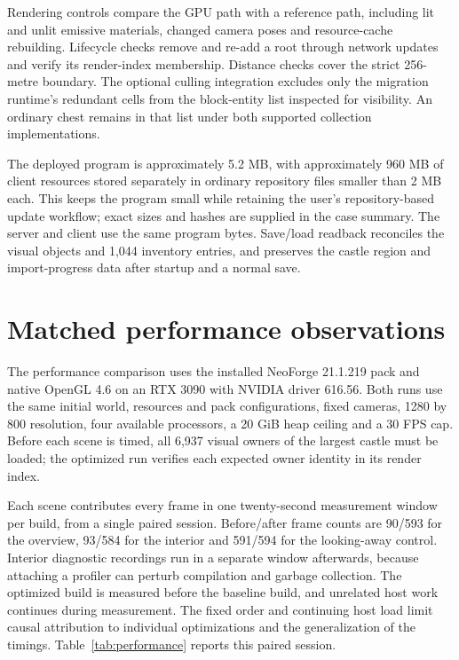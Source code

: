 \documentclass[11pt]{article}
\begin{document}
Rendering controls compare the GPU path with a reference path, including lit and
unlit emissive materials, changed camera poses and resource-cache rebuilding.
Lifecycle checks remove and re-add a root through network updates and verify its
render-index membership. Distance checks cover the strict 256-metre boundary.
The optional culling integration excludes only the migration runtime's redundant
cells from the block-entity list inspected for visibility. An ordinary chest
remains in that list under both supported collection implementations.

The deployed program is approximately 5.2 MB, with approximately 960 MB of client
resources stored separately in ordinary repository files smaller than 2 MB each.
This keeps the program small while retaining the user's repository-based update
workflow; exact sizes and hashes are supplied in the case summary. The server
and client use the same program bytes. Save/load readback reconciles the visual
objects and 1,044 inventory entries, and preserves the castle region and
import-progress data after startup and a normal save.

\section{Matched performance observations}

The performance comparison uses the installed NeoForge 21.1.219 pack and native
OpenGL 4.6 on an RTX 3090 with NVIDIA driver 616.56. Both runs use the same initial
world, resources and pack configurations, fixed cameras, 1280 by 800 resolution,
four available processors, a 20 GiB heap ceiling and a 30 FPS cap. Before each
scene is timed, all 6,937 visual owners of the largest castle must be loaded;
the optimized run verifies each expected owner identity in its render index.

Each scene contributes every frame in one twenty-second measurement window per
build, from a single paired session. Before/after frame counts are 90/593 for
the overview, 93/584 for the interior and 591/594 for the looking-away control.
Interior diagnostic recordings run in a separate window afterwards, because
attaching a profiler can perturb compilation and garbage collection. The
optimized build is measured before the baseline build, and unrelated host work
continues during measurement. The fixed order and continuing host load limit
causal attribution to individual optimizations and the generalization of the
timings. Table~\ref{tab:performance} reports this paired session.
\end{document}
